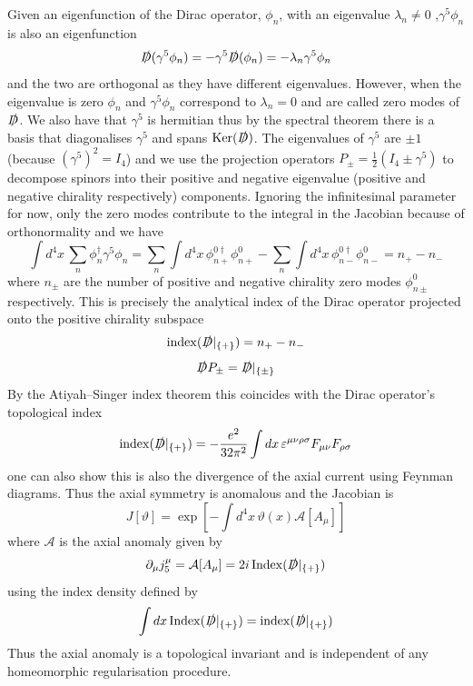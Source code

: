 \documentclass[11pt, a4paper]{article}
\theoremstyle{definition}
\theoremstyle{plain}
\begin{document}
Given an eigenfunction of the Dirac operator, $\phi_n$, with an eigenvalue $\lambda_n \neq 0$ 
,$\gamma^5\phi_n$ is also an eigenfunction
\begin{equation}
  \slashed{D}(\gamma^5\phi_n) = -\gamma^5\slashed{D}(\phi_n) = -\lambda_n\gamma^5\phi_n
\end{equation}
and the two are orthogonal as they have different eigenvalues.
However, when the eigenvalue is zero $\phi_n$ and $\gamma^5\phi_n$ correspond to $\lambda_n = 0$
and are called zero modes of $\slashed{D}$. We also have that $\gamma^5$ is 
hermitian thus by the spectral theorem there is a basis that diagonalises $\gamma^5$
and spans $\mathrm{Ker}(\slashed{D})$. The eigenvalues of $\gamma^5$ are $\pm 1$
(because ${(\gamma^5)}^2 = I_4$) and we use the projection
operators $P_\pm = \frac{1}{2}(I_4 \pm \gamma^5)$ to decompose
spinors into their positive and negative eigenvalue (positive and negative chirality respectively)
components. Ignoring the infinitesimal parameter for now, only the zero modes contribute
to the integral in the Jacobian because of orthonormality and we have
\begin{equation}
  \int{d^4x\, \sum_n{\phi^\dagger_n\gamma^5\phi_n}}
  = \sum_n{\int{d^4x\,\phi^{0\dagger}_{n+}\phi^0_{n+}}}
  -\sum_n{\int{d^4x\,\phi^{0\dagger}_{n-}\phi^0_{n-}}} = n_+ - n_-
\end{equation}
where $n_\pm$ are the number of positive and negative chirality zero modes $\phi^0_{n\pm}$
respectively. This is precisely the analytical index of the Dirac operator 
projected onto the positive chirality subspace
\begin{equation}
  \mathrm{index}(\slashed{D}|_{\{+\}}) = n_+ - n_- 
\end{equation}
\begin{equation}
  \slashed{D}P_{\pm} = \slashed{D}|_{\{\pm\}} 
\end{equation}
By the Atiyah–Singer index theorem this coincides with the Dirac operator's 
topological index
\begin{equation}
  \mathrm{index}(\slashed{D}|_{\{+\}}) = - \frac{e^2}{32\pi^2}\int{dx\,
  \varepsilon^{\mu\nu\rho\sigma}F_{\mu\nu}F_{\rho\sigma}}
\end{equation}
one can also show this is also the divergence of the axial current using Feynman diagrams.
Thus the axial symmetry is anomalous and the Jacobian is
\begin{equation}
  J[\vartheta] = \exp{\left[-\int{d^4x\,\vartheta(x)\mathcal{A}[A_\mu]}\right]}
\end{equation}
where $\mathcal{A}$ is the axial anomaly given by
\begin{equation}
  \partial_\mu j^\mu_5 = \mathcal{A}[A_\mu] = 2i\,\mathrm{Index}(\slashed{D}|_{\{+\}})
\end{equation}
using the index density defined by
\begin{equation}
  \int{dx\, \mathrm{Index}(\slashed{D}|_{\{+\}})} = \mathrm{index}(\slashed{D}|_{\{+\}})
\end{equation}
Thus the axial anomaly is a topological invariant
and is independent of any homeomorphic regularisation procedure.


\newpage


\end{document}
